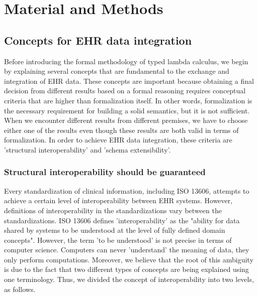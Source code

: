 \documentclass[preprint,3p,onecolumn,times,review]{elsarticle}
\begin{document}
\section{Material and Methods}


\subsection{Concepts for EHR data integration\label{sec:higher_concepts}}

Before introducing the formal methodology of typed lambda calculus, we begin by explaining several concepts that are fundamental to the exchange and integration of EHR data.
These concepts are important because obtaining a final decision from different results based on a formal reasoning requires conceptual criteria that are higher than formalization itself.
In other words, formalization is the necessary requirement for building a solid semantics, but it is not sufficient.
When we encounter different results from different premises, we have to choose either one of the results even though these results are both valid in terms of formalization.
In order to achieve EHR data integration, these criteria are 'structural interoperability' and 'schema extensibility'.


\subsubsection{Structural interoperability should be guaranteed}


Every standardization of clinical information, including ISO 13606, attempts to achieve a certain level of interoperability between EHR systems.
However, definitions of interoperability in the standardizations vary between the standardizations.
ISO 13606 defines 'interoperability' as the "ability for data shared by systems to be understood at the level of fully defined domain concepts"\cite[p.5]{iso08:13606_healt_elect_part1}.
However, the term 'to be understood' is not precise in terms of computer science. Computers can never 'understand' the meaning of data, they only perform computations.
Moreover, we believe that the root of this ambiguity is due to the fact that two different types of concepts are being explained using one terminology.
Thus, we divided the concept of interoperability into two levels, as follows.
\end{document}
